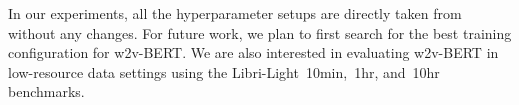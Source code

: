 \documentclass{article}
\begin{document}
In our experiments, all the hyperparameter setups are directly taken from~\cite{zhang2020pushing} without any changes.
For future work, we plan to first search for the best training configuration for w2v-BERT.
We are also interested in evaluating w2v-BERT in low-resource data settings using the Libri-Light~10min,~1hr, and~10hr benchmarks.







\end{document}
